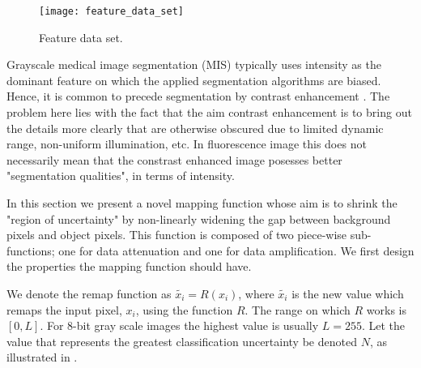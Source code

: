 \begin{figure}[!h]
	\centering
	\texttt{[image: feature\_data\_set]}
	\caption{Feature data set.}
	\label{fig:featuredataset}
\end{figure}

Grayscale medical image segmentation (MIS) typically uses intensity as the dominant feature on which the applied segmentation algorithms are biased. Hence, it is common to precede segmentation by contrast enhancement \citep{Kim2003,Subr2005}. The problem here lies with the fact that the aim contrast enhancement is to bring out the details more clearly that are otherwise obscured due to limited dynamic range, non-uniform illumination, etc. In fluorescence image this does not necessarily mean that the constrast enhanced image posesses better "segmentation qualities", in terms of intensity.

In this section we present a novel mapping function whose aim is to shrink the "region of uncertainty" by non-linearly widening the gap between background pixels and object pixels. This function is composed of two piece-wise sub-functions; one for data attenuation and one for data amplification. We first design the properties the mapping function should have. 

\begin{definition}
	We denote the remap function as $\widetilde{x_i} = R(x_i)$, where $\widetilde{x_i}$ is the new value which remaps the input pixel, $x_i$, using the function $R$. The range on which $R$ works is $[0,L]$. For 8-bit gray scale images the highest value is usually $L=255$. Let the value that represents the greatest classification uncertainty be denoted $N$, as illustrated in .
\end{definition}


